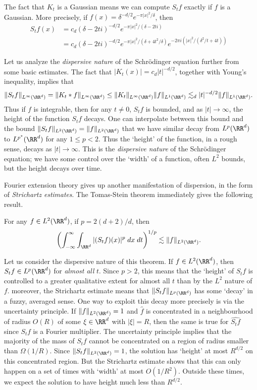 The fact that $K_t$ is a Gaussian means we can compute $S_t f$ exactly if $f$ is a Gaussian. More precisely, if $f(x) = \delta^{-d/2} e^{- \pi |x|^2/\delta}$, then
%
\begin{align*}
    S_tf(x) &= c_d (\delta - 2ti)^{-d/2} e^{- \pi |x|^2 / (\delta - 2ti)}\\
    &= c_d (\delta - 2ti)^{-d/2} e^{-\pi |x|^2 /(\delta + 4t^2 / \delta)} e^{- 2\pi i (|x|^2 / (\delta^2/t + 4t))}
\end{align*}

Let us analyze the \emph{dispersive nature} of the Schr\"{o}dinger equation further from some basic estimates. The fact that $|K_t(x)| = c_d |t|^{-d/2}$, together with Young's inequality, implies that
%
\[ \| S_t f \|_{L^\infty(\RR^d)} = \| K_t * f \|_{L^\infty(\RR^d)} \leq \| K_t \|_{L^\infty(\RR^d)} \| f \|_{L^1(\RR^d)} \lesssim_d |t|^{-d/2} \| f \|_{L^1(\RR^d)}. \]
%
Thus if $f$ is integrable, then for any $t \neq 0$, $S_t f$ is bounded, and as $|t| \to \infty$, the height of the function $S_t f$ decays. One can interpolate between this bound and the bound $\| S_t f \|_{L^2(\RR^d)} = \| f \|_{L^2(\RR^d)}$ that we have similar decay from $L^p(\RR^d)$ to $L^{\smash{p^*}}(\RR^d)$ for any $1 \leq p < 2$. Thus the `height' of the function, in a rough sense, decays as $|t| \to \infty$. This is the \emph{dispersive nature} of the Schr\"{o}dinger equation; we have some control over the `width' of a function, often $L^2$ bounds, but the height decays over time.

Fourier extension theory gives up another manifestation of dispersion, in the form of \emph{Strichartz estimates}. The Tomas-Stein theorem immediately gives the following result.

\begin{theorem}
    For any $f \in L^2(\RR^d)$, if $p = 2(d+2)/d$, then
    \[ \left( \int_{-\infty}^\infty \int_{\RR^d} |(S_t f)(x)|^{p}\; dx\; dt \right)^{1/p} \lesssim \| f \|_{L^2(\RR^d)}. \]
\end{theorem}

Let us consider the dispersive nature of this theorem. If $f \in L^2(\RR^d)$, then $S_t f \in L^p(\RR^d)$ for \emph{almost all} $t$. Since $p > 2$, this means that the `height' of $S_t f$ is controlled to a greater qualitative extent for almost all $t$ than by the $L^2$ nature of $f$. moreover, the Strichartz estimate means that $\| S_t f \|_{L^p(\RR^d)}$ has some `decay' in a fuzzy, averaged sense. One way to exploit this decay more precisely is via the uncertainty principle. If $\| f \|_{L^2(\RR^d)} = 1$ and $\widehat{f}$ is concentrated in a neighbourhood of radius $O(R)$ of some $\xi \in \RR^d$ with $|\xi| = R$, then the same is true for $\widehat{S_t f}$ since $S_t f$ is a Fourier multiplier. The uncertainty principle implies that the majority of the mass of $S_t f$ cannot be concentrated on a region of radius smaller than $\Omega(1/R)$. Since $\| S_t f \|_{L^2(\RR^d)} = 1$, the solution has `height' at most $R^{d/2}$ on this concentrated region. But the Strichartz estimate shows that this can only happen on a set of times with `width' at most $O(1/R^2)$. Outside these times, we expect the solution to have height much less than $R^{d/2}$.

